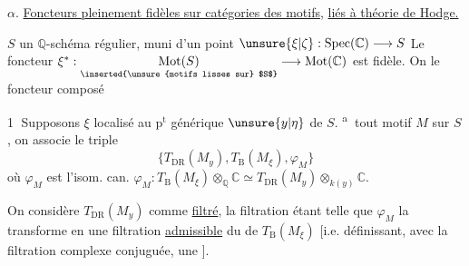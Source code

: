 \textcircled{$\alpha$}. \uline{Foncteurs pleinement fidèles sur catégories des motifs}, \uline{liés à théorie de Hodge.}

$S$ un $\mathbb{Q}$-schéma régulier, muni d'un point  $\unsure{\xi|\zeta}:\operatorname{Spec}(\mathbb{C})\longrightarrow S$
Le foncteur $\xi^*:\underset{\text{\inserted{\unsure{motifs lisses sur} $S$}}}{\operatorname{Mot}(S)}\longrightarrow\operatorname{Mot}(\mathbb{C})$ est fidèle. On  le foncteur composé

\textcircled{1}  Supposons $\xi$ localisé au $\mathrm{p}^{\mathrm t}$ générique $\unsure{y|\eta}$ de $S$.  \textsuperscript{\textcircled{a}}  tout motif $M$ sur $S$, on associe le triple
\[
\bigl\{T_{\mathrm{DR}}(M_y),T_{\mathrm B}(M_\xi),\varphi_M\bigr\}
\]
où $\varphi_M$ est l'isom. can. $\varphi_M:T_{\mathrm B}(M_\xi)\otimes_{\mathbb Q}\mathbb C\simeq T_{\mathrm{DR}}(M_y)\otimes_{k(y)}\mathbb C$.

On considère $T_{\mathrm{DR}}(M_y)$ comme \uline{filtré}, la filtration étant telle que $\varphi_M$ la transforme en une filtration \uline{admissible} du  de $T_{\mathrm B}(M_\xi)$ [i.e. définissant, avec la filtration complexe conjuguée, une ].

